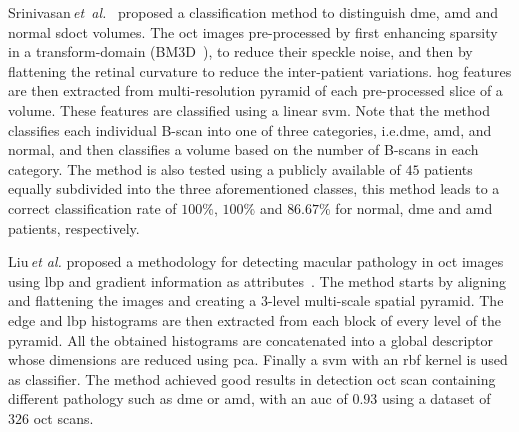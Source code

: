 %
Srinivasan\,\textit{et~al.}~\cite{Srinivasan2014} proposed a classification method to distinguish \gls{dme}, \gls{amd} and normal \gls{sdoct} volumes.
%
The \gls{oct} images pre-processed by first enhancing sparsity in a transform-domain (BM3D~\cite{dabov2007image}), to reduce their speckle noise, and then by flattening the retinal curvature to reduce the inter-patient variations.
\gls{hog} features are then extracted from multi-resolution pyramid of each pre-processed slice of a volume.
These features are classified using a linear \gls{svm}.
Note that the method classifies each individual B-scan into one of three categories, i.e.\gls{dme}, \gls{amd}, and normal, and then classifies a volume based on the number of B-scans in each category.
%
The method is also tested using a publicly available of $45$ patients equally subdivided into the three aforementioned classes, this method leads to a correct classification rate of $100 \%$, $100 \%$ and $86.67 \%$ for normal, \gls{dme} and \gls{amd} patients, respectively.



Liu\,\textit{et al.} proposed a methodology for detecting macular pathology in \gls{oct} images using \gls{lbp} and gradient information as attributes~\cite{Liu2011}.
The method starts by aligning and flattening the images and creating a $3$-level multi-scale spatial pyramid.
The edge and \gls{lbp} histograms are then extracted from each block of every level of the pyramid.
All the obtained histograms are concatenated into a global descriptor whose dimensions are reduced using \gls{pca}.
Finally a \gls{svm} with an \gls{rbf} kernel is used as classifier.
The method achieved good results in detection \gls{oct} scan containing different pathology such as \gls{dme} or \gls{amd}, with an \gls{auc} of $0.93$ using a dataset of $326$ \gls{oct} scans.


